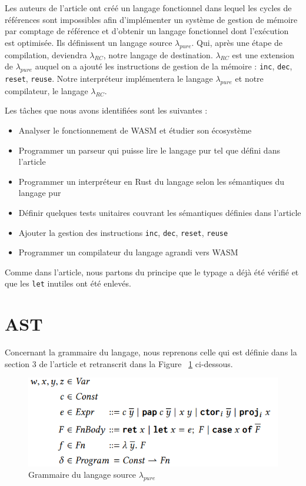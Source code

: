\documentclass{rapportECL}
\begin{document}
Les auteurs de l'article\cite{ullrich_counting_2020} ont créé un langage fonctionnel dans lequel les cycles de références 
sont impossibles afin d'implémenter un système de gestion de mémoire par comptage de référence et d'obtenir un langage fonctionnel 
dont l'exécution est optimisée. Ils définissent un langage source $\lambda_{pure}$. 
Qui, après une étape de compilation, deviendra $\lambda_{RC}$, notre langage de destination.
$\lambda_{RC}$ est une extension de $\lambda_{pure}$ auquel on a ajouté les instructions de gestion de la mémoire : 
\verb|inc|, \verb|dec|, \verb|reset|, \verb|reuse|.
Notre interpréteur implémentera le langage $\lambda_{pure}$ et notre compilateur, le langage $\lambda_{RC}$.


Les tâches que nous avons identifiées sont les suivantes :

\begin{itemize}
	\item Analyser le fonctionnement de WASM et étudier son écosystème
	\item Programmer un parseur qui puisse lire le langage pur tel que défini dans l'article\cite{ullrich_counting_2020}
	\item Programmer un interpréteur en Rust du langage selon les sémantiques du langage pur
	\item Définir quelques tests unitaires couvrant les sémantiques définies dans l'article
	\item Ajouter la gestion des instructions \verb|inc|, \verb|dec|, \verb|reset|, \verb|reuse|
	\item Programmer un compilateur du langage agrandi vers WASM
\end{itemize}

Comme dans l'article, nous partons du principe que le typage a déjà été vérifié et que les \verb|let| inutiles ont été enlevés.

\section{AST}

Concernant la grammaire du langage, nous reprenons celle qui est définie dans la section 3 de l'article et retranscrit dans la Figure ~\ref{fig:grammaire pure} ci-dessous.

\begin{figure}[hbt!]
	\centering
	\includegraphics[scale=0.70]{logos/grammaire.png}
	\caption{Grammaire du langage source $\lambda_{pure}$}
	\label{fig:grammaire pure}
\end{figure}
\FloatBarrier
\end{document}
